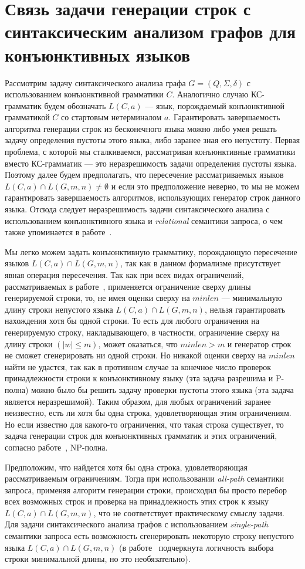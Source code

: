 \section{Связь задачи генерации строк с синтаксическим анализом графов для конъюнктивных языков}

Рассмотрим задачу синтаксического анализа графа $G = (Q, \Sigma, \delta)$ с использованием конъюнктивной грамматики $C$. Аналогично случаю КС-грамматик будем обозначать $L(C,a)$ --- язык, порождаемый конъюнктивной грамматикой $C$ со стартовым нетерминалом $a$. Гарантировать завершаемость алгоритма генерации строк из бесконечного языка можно либо умея решать задачу определения пустоты этого языка, либо заранее зная его непустоту. Первая проблема, с которой мы сталкиваемся, рассматривая конъюнктивные грамматики вместо КС-грамматик --- это неразрешимость задачи определения пустоты языка. Поэтому далее будем предполагать, что пересечение рассматриваемых языков $L(C,a) \cap L(G,m,n) \ne \emptyset$ и если это предположение неверно, то мы не можем гарантировать завершаемость алгоритмов, использующих генератор строк данного языка. Отсюда следует неразрешимость задачи синтаксического анализа с использованием конъюнктивного языка и \textit{relational} семантики запроса, о чем также упоминается в работе~\cite{azimov-spbu-hellings1}.

Мы легко можем задать конъюнктивную грамматику, порождающую пересечение языков $L(C,a) \cap L(G,m,n)$, так как в данном формализме присутствует явная операция пересечения. Так как при всех видах ограничений, рассматриваемых в работе~\cite{azimov-spbu-Okhotin}, применяется ограничение сверху длины генерируемой строки, то, не имея оценки сверху на $minlen$ --- минимальную длину строки непустого языка $L(C,a) \cap L(G,m,n)$, нельзя гарантировать нахождения хотя бы одной строки. То есть для любого ограничения на генерируемую строку, накладывающего, в частности, ограничение сверху на длину строки $(|w| \le m)$, может оказаться, что $minlen > m$ и генератор строк не сможет сгенерировать ни одной строки. Но никакой оценки сверху на $minlen$ найти не удастся, так как в противном случае за конечное число проверок принадлежности строки к конъюнктивному языку (эта задача разрешима и P-полна) можно было бы решить задачу проверки пустоты этого языка (эта задача является неразрешимой). Таким образом, для любых ограничений заранее неизвестно, есть ли хотя бы одна строка, удовлетворяющая этим ограничениям. Но если известно для какого-то ограничения, что такая строка существует, то задача генерации строк для конъюнктивных грамматик и этих ограничений, согласно работе~\cite{azimov-spbu-Okhotin}, NP-полна.

Предположим, что найдется хотя бы одна строка, удовлетворяющая рассматриваемым ограничениям. Тогда при использовании \textit{all-path} семантики запроса, применяя алгоритм генерации строки, происходил бы просто перебор всех возможных строк и проверка на принадлежность этих строк к языку $L(C,a) \cap L(G,m,n)$, что не соответствует практическому смыслу задачи. Для задачи синтаксического анализа графов с использованием \textit{single-path} семантики запроса есть возможность сгенерировать некоторую строку непустого языка $L(C,a) \cap L(G,m,n)$ (в работе~\cite{azimov-spbu-hellings2} подчеркнута логичность выбора строки минимальной длины, но это необязательно).
